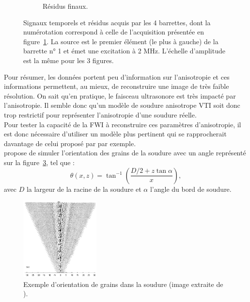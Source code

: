 \begin{figure}[h!]
\begin{changemargin}{-1cm}{-2cm}
\begin{subfigure}[b]{0.29\textwidth}
		\caption{Résidus finaux.\label{app:ani:data_ap}}
	\end{subfigure}
	\caption{ Signaux temporels et résidus acquis par les 4 barrettes, dont la numérotation correspond à celle de l'acquisition présentée en figure~\ref{app:ani:data_ap}. La source est le premier élément (le plus à gauche) de la barrette n° 1 et émet une excitation à 2 MHz.   L'échelle d'amplitude est la même pour les 3 figures. \label{app:ani:data}}
	\end{changemargin}
\end{figure}

 Pour résumer, les données portent peu d'information sur l'anisotropie et ces informations permettent, au mieux, de reconstruire une image de très faible résolution. On sait qu'en pratique, le faisceau ultrasonore est très impacté par l'anisotropie. Il semble donc qu'un modèle de soudure anisotrope VTI soit donc trop restrictif pour représenter l'anisotropie d'une soudure réelle.\\
 
 Pour tester la capacité de la FWI à reconstruire ces paramètres d'anisotropie, il est donc nécessaire d'utiliser un modèle plus pertinent qui se rapprocherait davantage de celui proposé par \cite{ogilvy} par exemple.\\
	\cite{ogilvy} propose de simuler l'orientation des grains de la soudure avec un angle représenté sur la figure~\ref{ogilvy_soud}, tel que : 
	\begin{equation}
		\theta(x,z) = \tan^{-1}\left( \frac{D/2 + z\tan\alpha}{x} \right),
	\end{equation}
	avec $D$ la largeur de la racine de la soudure et $\alpha$  l'angle du bord de soudure. 
 
\begin{figure}[!h]
	\centering
			\includegraphics[width=4cm]{img/ogilvy_modele.png}
			\caption{ Exemple d'orientation de grains dans la soudure (image extraite de \cite{ogilvy}).\label{ogilvy_soud}}
\end{figure} 
 
